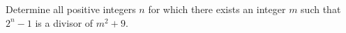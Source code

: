 Determine all positive integers $n$ for which there exists an integer $m$ such that $2^n - 1$ is a divisor of $m^2 + 9$.
